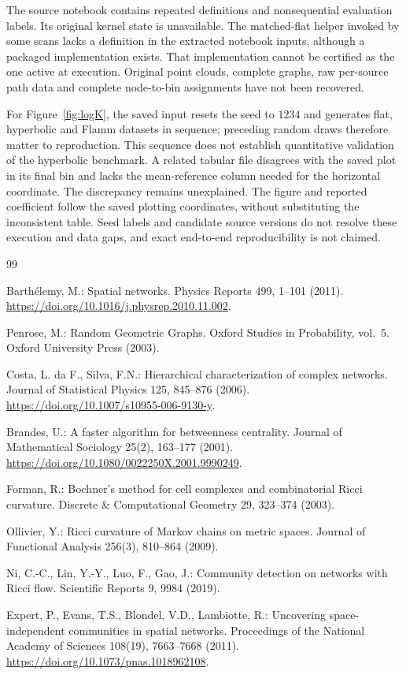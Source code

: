 \documentclass[11pt,a4paper]{article}
\begin{document}
The source notebook contains repeated definitions and nonsequential evaluation labels. Its original kernel state is unavailable. The matched-flat helper invoked by some scans lacks a definition in the extracted notebook inputs, although a packaged implementation exists. That implementation cannot be certified as the one active at execution. Original point clouds, complete graphs, raw per-source path data and complete node-to-bin assignments have not been recovered.

For Figure~\ref{fig:logK}, the saved input resets the seed to $1234$ and generates flat, hyperbolic and Flamm datasets in sequence; preceding random draws therefore matter to reproduction. This sequence does not establish quantitative validation of the hyperbolic benchmark. A related tabular file disagrees with the saved plot in its final bin and lacks the mean-reference column needed for the horizontal coordinate. The discrepancy remains unexplained. The figure and reported coefficient follow the saved plotting coordinates, without substituting the inconsistent table. Seed labels and candidate source versions do not resolve these execution and data gaps, and exact end-to-end reproducibility is not claimed.

\begingroup
\raggedright
\begin{thebibliography}{99}

Barth\'elemy, M.: Spatial networks. Physics Reports 499, 1--101 (2011). \url{https://doi.org/10.1016/j.physrep.2010.11.002}.

Penrose, M.: Random Geometric Graphs. Oxford Studies in Probability, vol.~5. Oxford University Press (2003).

Costa, L. da F., Silva, F.N.: Hierarchical characterization of complex networks. Journal of Statistical Physics 125, 845--876 (2006). \url{https://doi.org/10.1007/s10955-006-9130-y}.

Brandes, U.: A faster algorithm for betweenness centrality. Journal of Mathematical Sociology 25(2), 163--177 (2001). \url{https://doi.org/10.1080/0022250X.2001.9990249}.

Forman, R.: Bochner's method for cell complexes and combinatorial Ricci curvature. Discrete \& Computational Geometry 29, 323--374 (2003).

Ollivier, Y.: Ricci curvature of Markov chains on metric spaces. Journal of Functional Analysis 256(3), 810--864 (2009).

Ni, C.-C., Lin, Y.-Y., Luo, F., Gao, J.: Community detection on networks with Ricci flow. Scientific Reports 9, 9984 (2019).

Expert, P., Evans, T.S., Blondel, V.D., Lambiotte, R.: Uncovering space-independent communities in spatial networks. Proceedings of the National Academy of Sciences 108(19), 7663--7668 (2011). \url{https://doi.org/10.1073/pnas.1018962108}.

\end{thebibliography}
\endgroup
\end{document}

